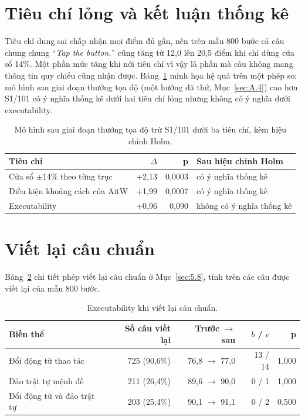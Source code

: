 \section{Tiêu chí lỏng và kết luận thống kê}\label{sec:B.4}

Tiêu chí dung sai chấp nhận mọi điểm đủ gần, nên trên mẫu 800 bước cả câu chung chung ``\emph{Tap the button.}'' cũng tăng từ 12,0 lên 20,5 điểm khi chỉ dùng cửa sổ 14\%. Một phần mức tăng khi nới tiêu chí vì vậy là phần mà câu không mang thông tin quy chiếu cũng nhận được. Bảng~\ref{tab:5.holm} minh họa hệ quả trên một phép so: mô hình sau giai đoạn thưởng tọa độ (một hướng đã thử, Mục~\ref{sec:A.4}) cao hơn S1/101 có ý nghĩa thống kê dưới hai tiêu chí lỏng nhưng không có ý nghĩa dưới executability.

\begin{table}[htbp]
\centering\small
\caption{Mô hình sau giai đoạn thưởng tọa độ trừ S1/101 dưới ba tiêu chí, kèm hiệu chỉnh Holm.}\label{tab:5.holm}
\begin{tabular}{@{}lrrl@{}}
\toprule
\textbf{Tiêu chí} & \textbf{$\Delta$} & \textbf{p} & \textbf{Sau hiệu chỉnh Holm} \\
\midrule
Cửa sổ $\pm$14\% theo từng trục & +2,13 & 0,0003 & có ý nghĩa thống kê \\
Điều kiện khoảng cách của AitW & +1,99 & 0,0007 & có ý nghĩa thống kê \\
Executability & +0,96 & 0,090 & không có ý nghĩa thống kê \\
\bottomrule
\end{tabular}
\end{table}

\section{Viết lại câu chuẩn}\label{sec:B.5}

Bảng~\ref{tab:5.3} chi tiết phép viết lại câu chuẩn ở Mục~\ref{sec:5.8}, tính trên các câu được viết lại của mẫu 800 bước.

\begin{table}[htbp]
\centering\small
\caption{Executability khi viết lại câu chuẩn.}\label{tab:5.3}
\begin{tabular}{@{}lrrrr@{}}
\toprule
\textbf{Biến thể} & \textbf{Số câu viết lại} & \textbf{Trước $\rightarrow$ sau} & \textbf{$b$ / $c$} & \textbf{p} \\
\midrule
Đổi động từ thao tác & 725 (90,6\%) & 76,8 $\rightarrow$ 77,0 & 13 / 14 & 1,000 \\
Đảo trật tự mệnh đề & 211 (26,4\%) & 89,6 $\rightarrow$ 90,0 & 0 / 1 & 1,000 \\
Đổi động từ và đảo trật tự & 203 (25,4\%) & 90,1 $\rightarrow$ 91,1 & 0 / 2 & 0,500 \\
\bottomrule
\end{tabular}
\end{table}
